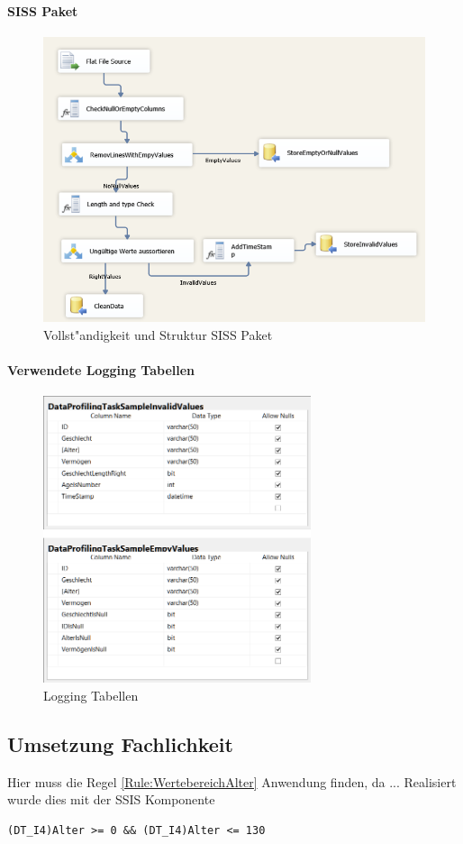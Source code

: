 \paragraph{SISS Paket}
\begin{figure}
	\centering
		\includegraphics[width=1.00\textwidth]{doku/Bilder/DataProfilingTaskSampleVollstaendigkeitUndStrukturSISS.PNG}
	\caption{Vollst"andigkeit und Struktur SISS Paket}
	\label{fig:DataProf}
\end{figure}
\paragraph{Verwendete Logging Tabellen}
\begin{figure}
	\centering
		\includegraphics[width=0.70\textwidth]{doku/Bilder/LoggingTables.png}
	\caption{Logging Tabellen}
	\label{fig:LoggingTables}
\end{figure}



\subsection{Umsetzung Fachlichkeit} Hier muss die Regel \ref{Rule:WertebereichAlter} Anwendung finden, da ... Realisiert wurde dies mit der SSIS Komponente 
\begin{lstlisting}
(DT_I4)Alter >= 0 && (DT_I4)Alter <= 130
\end{lstlisting}
